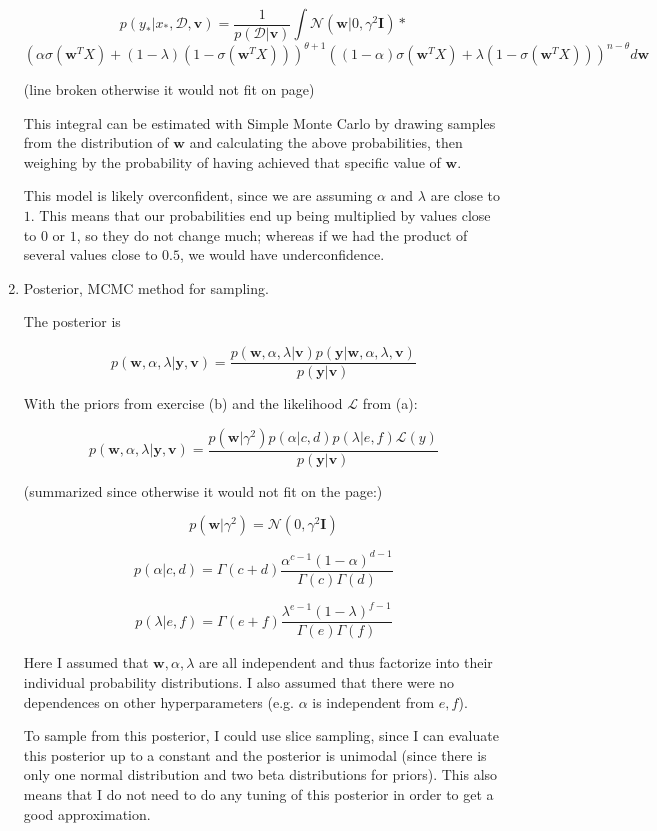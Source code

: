 \documentclass[11pt]{article}
\newcommand{\ind}{\ensuremath{\mathbf{I}}}
\newcommand{\mbf}[1]{{\boldsymbol{\mathbf{#1}}}}
\renewcommand{\bm}{\mbf}
\begin{document}
\begin{enumerate}[label=\textbf{\alph*.}]
        $$
        p(y_*|x_*, \mathcal{D}, \bm{v}) = \dfrac{1}{p(\mathcal{D}| \bm{v})} \int \mathcal{N}(\bm{w}|0, \gamma^2 \ind) * $$$$ (\alpha \sigma(\bm{w}^T X) + (1 - \lambda) (1 - \sigma(\bm{w}^T X)))^{\theta + 1} ((1 - \alpha) \sigma(\bm{w}^T X) + \lambda (1 - \sigma(\bm{w}^T X)))^{n - \theta} d\bm{w}
        $$

        (line broken otherwise it would not fit on page)

        This integral can be estimated with Simple Monte Carlo by drawing samples from the distribution of $\bm{w}$ and calculating the above probabilities, then weighing by the probability of having achieved that specific value of $\bm{w}$.

        This model is likely overconfident, since we are assuming $\alpha$ and $\lambda$ are close to $1$. This means that our probabilities end up being multiplied by values close to $0$ or $1$, so they do not change much; whereas if we had the product of several values close to $0.5$, we would have underconfidence.

    \item Posterior, MCMC method for sampling.

        The posterior is

        $$
        p(\bm{w}, \alpha, \lambda|\bm{y},\bm{v}) = \dfrac{p(\bm{w}, \alpha, \lambda|\bm{v}) p(\bm{y}|\bm{w}, \alpha, \lambda, \bm{v})}{p(\bm{y}|\bm{v})}
        $$

        With the priors from exercise (b) and the likelihood $\mathcal{L}$ from (a):

        $$
        p(\bm{w}, \alpha, \lambda|\bm{y},\bm{v}) = \dfrac{p(\bm{w}|\gamma^2) p(\alpha|c,d) p(\lambda|e,f) \mathcal{L}(y)}{p(\bm{y}|\bm{v})}
        $$

        (summarized since otherwise it would not fit on the page:)

        $$
        p(\bm{w}|\gamma^2) = \mathcal{N}(0, \gamma^2 \ind)
        $$

        $$
        p(\alpha|c,d) = \Gamma(c+d) \dfrac{\alpha^{c-1} (1 - \alpha)^{d-1}}{\Gamma(c)\Gamma(d)}
        $$

        $$
        p(\lambda|e,f) = \Gamma(e+f) \dfrac{\lambda^{e-1} (1 - \lambda)^{f-1}}{\Gamma(e)\Gamma(f)}
        $$

        Here I assumed that $\bm{w}, \alpha, \lambda$ are all independent and thus factorize into their individual probability distributions. I also assumed that there were no dependences on other hyperparameters (e.g. $\alpha$ is independent from $e, f$).

        To sample from this posterior, I could use slice sampling, since I can evaluate this posterior up to a constant and the posterior is unimodal (since there is only one normal distribution and two beta distributions for priors). This also means that I do not need to do any tuning of this posterior in order to get a good approximation.

\end{enumerate}
\end{document}

